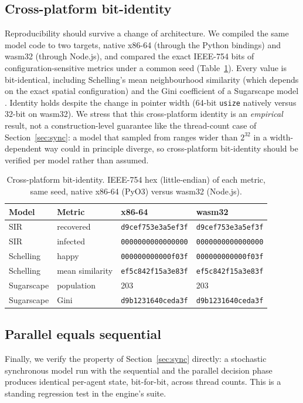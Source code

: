 \documentclass[review]{elsarticle}
\begin{document}
\subsection{Cross-platform bit-identity}
Reproducibility should survive a change of architecture. We compiled the same
model code to two targets, native x86-64 (through the Python bindings) and
wasm32 (through Node.js), and compared the exact IEEE-754 bits of
configuration-sensitive metrics under a common seed (Table~\ref{tab:crossplat}).
Every value is bit-identical, including Schelling's mean neighbourhood
similarity (which depends on the exact spatial configuration) and the Gini
coefficient of a Sugarscape model \cite{epstein1996growing}. Identity holds
despite the change in pointer width (64-bit \texttt{usize} natively versus
32-bit on wasm32). We stress that this cross-platform identity is an
\emph{empirical} result, not a construction-level guarantee like the
thread-count case of Section~\ref{sec:sync}: a model that sampled from ranges
wider than $2^{32}$ in a width-dependent way could in principle diverge, so
cross-platform bit-identity should be verified per model rather than assumed.

\begin{table}[t]
\centering
\caption{Cross-platform bit-identity. IEEE-754 hex (little-endian) of each
metric, same seed, native x86-64 (PyO3) versus wasm32 (Node.js).}
\label{tab:crossplat}
\begin{tabular}{llll}
\toprule
Model & Metric & x86-64 & wasm32 \\
\midrule
SIR        & recovered        & \texttt{d9cef753e3a5ef3f} & \texttt{d9cef753e3a5ef3f} \\
SIR        & infected         & \texttt{0000000000000000} & \texttt{0000000000000000} \\
Schelling  & happy            & \texttt{000000000000f03f} & \texttt{000000000000f03f} \\
Schelling  & mean similarity  & \texttt{ef5c842f15a3e83f} & \texttt{ef5c842f15a3e83f} \\
Sugarscape & population       & 203                      & 203                      \\
Sugarscape & Gini             & \texttt{d9b1231640ceda3f} & \texttt{d9b1231640ceda3f} \\
\bottomrule
\end{tabular}
\end{table}

\subsection{Parallel equals sequential}
Finally, we verify the property of Section~\ref{sec:sync} directly: a stochastic
synchronous model run with the sequential and the parallel decision phase
produces identical per-agent state, bit-for-bit, across thread counts. This is a
standing regression test in the engine's suite.
\end{document}
